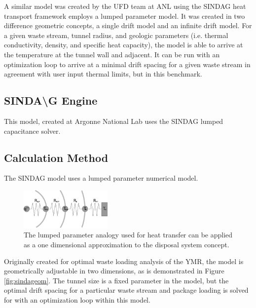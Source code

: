 \documentclass{anstrans}
\begin{document}
A similar model was created by the UFD team at \gls{ANL} using the \gls{SINDAG} 
heat transport framework employs a lumped parameter model. It was created in two  
difference geometric concepts, a single drift model and an infinite drift model.  
For a given waste stream, tunnel radius, and geologic parameters (i.e.  thermal 
conductivity, density, and specific heat capacity), the model is able to arrive  
at the temperature at the tunnel wall and adjacent. It can be run with an 
optimization loop to arrive at a minimal drift spacing for a given waste stream 
in agreement with user input thermal limits, but in this benchmark. 

\subsection{SINDA{\textbackslash}G Engine}

This model, created at Argonne National Lab  uses the \gls{SINDAG} lumped 
capacitance solver.  

\subsection{Calculation Method}

The \gls{SINDAG} model uses a lumped parameter numerical model.

\begin{figure}[h!]
  \begin{center}
    \includegraphics[width=0.4\textwidth]{lumpedParam.eps}
  \end{center}
  \caption{The lumped parameter analogy used for heat transfer can be applied as 
  a one dimensional approximation to the disposal system concept. }
  \label{fig:lumpedParam}
\end{figure}

Originally created for optimal waste loading analysis of the \gls{YMR}, the 
model is geometrically adjustable in two dimensions,  as is demonstrated in 
Figure \ref{fig:sindageom}. The tunnel size is a fixed parameter in the model, 
but the optimal drift spacing for a particular waste stream and package loading 
is solved for with an optimization loop within this model.
\end{document}
